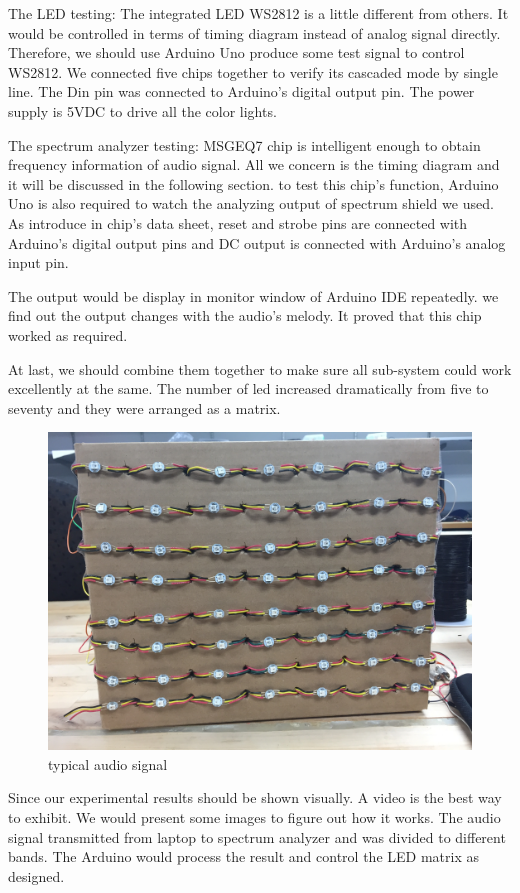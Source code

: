 \documentclass[12pt,a4paper,journal]{IEEEtran}
\begin{document}
The LED testing: The integrated LED WS2812 is a little different from others. It would be controlled in terms of timing diagram instead of analog signal directly. Therefore, we should use Arduino Uno produce some test signal to control WS2812. We connected five chips together to verify its cascaded mode by single line. The Din pin was connected to Arduino's digital output pin. The power supply is 5VDC to drive all the color lights.

The spectrum analyzer testing: MSGEQ7 chip is intelligent enough to obtain frequency information of audio signal. All we concern is the timing diagram and it will be discussed in the following section. to test this chip's function, Arduino Uno is also required to watch the analyzing output of spectrum shield we used. As introduce in chip's data sheet, reset and strobe pins are connected with Arduino's digital output pins and DC output is connected with Arduino's analog input pin.

The output would be display in monitor window of Arduino IDE repeatedly. we find out the output changes with the audio's melody. It proved that this chip worked as required.

At last, we should combine them together to make sure all sub-system could work excellently at the same. The number of led increased dramatically from five to seventy and they were arranged as a matrix.
\begin{figure}[ht]
  \centering
  \includegraphics[width=0.9\linewidth]{ledmatrix.jpg}
  \caption{typical audio signal}
  \label{fig:tas6}
\end{figure}
Since our experimental results should be shown visually. A video is the best way to exhibit. We would present some images to figure out how it works. The audio signal transmitted from laptop to spectrum analyzer and was divided to different bands. The Arduino would process the result and control the LED matrix as designed. 
\end{document}
